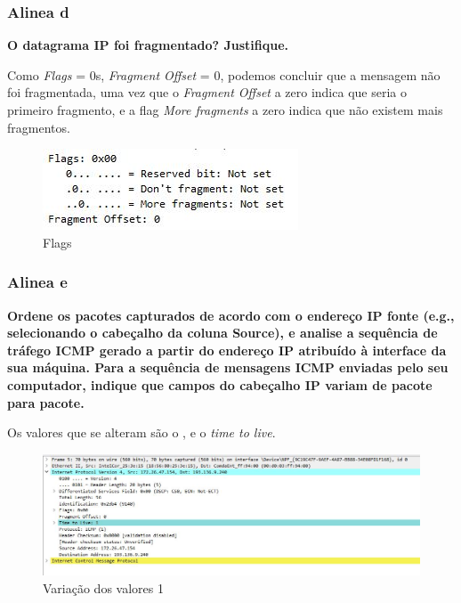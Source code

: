 \documentclass{article}
\begin{document}
\subsubsection{Alinea d}
\textbf{O datagrama IP foi fragmentado? Justifique.} \\\par
Como \textit{Flags} = 0s, \textit{Fragment Offset} = 0, podemos concluir que a mensagem não foi fragmentada, uma vez que o \textit{Fragment Offset} a zero indica que seria o primeiro fragmento, e a flag \textit{More fragments} a zero indica que não existem mais fragmentos.\\\par

\begin{figure}[h]
	\centering
	\includegraphics[scale = 0.8]{flags.JPG}
	\caption{Flags}
\end{figure}

\subsubsection{Alinea e}
\textbf{Ordene os pacotes capturados de acordo com o endereço IP fonte (e.g., selecionando o cabeçalho da coluna Source), e analise a sequência de tráfego ICMP gerado a partir do endereço IP atribuído à interface da sua máquina. Para a sequência de mensagens ICMP enviadas pelo seu computador, indique que campos do cabeçalho IP variam de pacote para pacote.} \\\par
Os valores que se alteram são o , e o \textit{time to live}.\\

\begin{figure}[h]
	\centering
	\includegraphics[scale = 0.5]{valores-variam-1.JPG}
	\caption{Variação dos valores 1}
\end{figure}
\end{document}
